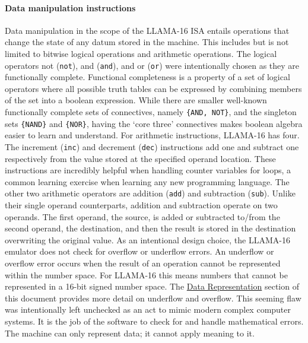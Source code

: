 \documentclass[man,hidelinks,floatsintext]{apa7}
\begin{document}
\paragraph{Data manipulation instructions}
\label{sec:dataman}
Data manipulation in the scope of the LLAMA-16 ISA entails operations that change the state of any datum stored in the machine. This includes but is not limited to bitwise logical operations and arithmetic operations. The logical operators not (\verb|not|), and (\verb|and|), and or (\verb|or|) were intentionally chosen as they are functionally complete. Functional completeness is a property of a set of logical operators where all possible truth tables can be expressed by combining members of the set into a boolean expression. While there are smaller well-known functionally complete sets of connectives, namely \verb|{AND, NOT}|, and the singleton sets \verb|{NAND}| and \verb|{NOR}|, having the `core three' connectives makes boolean algebra easier to learn and understand. For arithmetic instructions, LLAMA-16 has four. The increment (\verb|inc|) and decrement (\verb|dec|) instructions add one and subtract one respectively from the value stored at the specified operand location. These instructions are incredibly helpful when handling counter variables for loops, a common learning exercise when learning any new programming language. The other two arithmetic operators are addition (\verb|add|) and subtraction (\verb|sub|). Unlike their single operand counterparts, addition and subtraction operate on two operands. The first operand, the source, is added or subtracted to/from the second operand, the destination, and then the result is stored in the destination overwriting the original value. As an intentional design choice, the LLAMA-16 emulator does not check for overflow or underflow errors. An underflow or overflow error occurs when the result of an operation cannot be represented within the number space. For LLAMA-16 this means numbers that cannot be represented in a 16-bit signed number space. The \hyperref[sec:datarep]{Data Representation} section of this document provides more detail on underflow and overflow. This seeming flaw was intentionally left unchecked as an act to mimic modern complex computer systems. It is the job of the software to check for and handle mathematical errors. The machine can only represent data; it cannot apply meaning to it.
\end{document}
